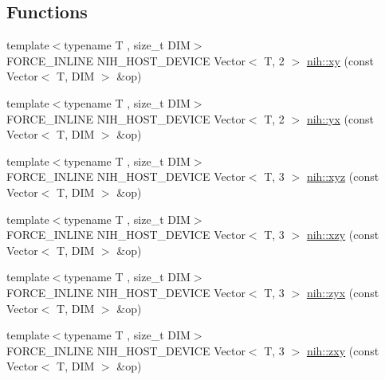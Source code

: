 \subsection*{\-Functions}
\begin{DoxyCompactItemize}
\item 
{\footnotesize template$<$typename T , size\-\_\-t \-D\-I\-M$>$ }\\\-F\-O\-R\-C\-E\-\_\-\-I\-N\-L\-I\-N\-E \-N\-I\-H\-\_\-\-H\-O\-S\-T\-\_\-\-D\-E\-V\-I\-C\-E \*
\-Vector$<$ \-T, 2 $>$ \hyperlink{group__vectors_gab815e30e4a8c47b3ff177de0ba4162cb}{nih\-::xy} (const \-Vector$<$ \-T, \-D\-I\-M $>$ \&op)
\item 
{\footnotesize template$<$typename T , size\-\_\-t \-D\-I\-M$>$ }\\\-F\-O\-R\-C\-E\-\_\-\-I\-N\-L\-I\-N\-E \-N\-I\-H\-\_\-\-H\-O\-S\-T\-\_\-\-D\-E\-V\-I\-C\-E \*
\-Vector$<$ \-T, 2 $>$ \hyperlink{group__vectors_gaa33a532874bb7f0c3977391f83dc64a3}{nih\-::yx} (const \-Vector$<$ \-T, \-D\-I\-M $>$ \&op)
\item 
{\footnotesize template$<$typename T , size\-\_\-t \-D\-I\-M$>$ }\\\-F\-O\-R\-C\-E\-\_\-\-I\-N\-L\-I\-N\-E \-N\-I\-H\-\_\-\-H\-O\-S\-T\-\_\-\-D\-E\-V\-I\-C\-E \*
\-Vector$<$ \-T, 3 $>$ \hyperlink{group__vectors_ga283f58e199d448be6746baec9dec6ac1}{nih\-::xyz} (const \-Vector$<$ \-T, \-D\-I\-M $>$ \&op)
\item 
{\footnotesize template$<$typename T , size\-\_\-t \-D\-I\-M$>$ }\\\-F\-O\-R\-C\-E\-\_\-\-I\-N\-L\-I\-N\-E \-N\-I\-H\-\_\-\-H\-O\-S\-T\-\_\-\-D\-E\-V\-I\-C\-E \*
\-Vector$<$ \-T, 3 $>$ \hyperlink{group__vectors_ga789568ee5abe245a1789c972459d9208}{nih\-::xzy} (const \-Vector$<$ \-T, \-D\-I\-M $>$ \&op)
\item 
{\footnotesize template$<$typename T , size\-\_\-t \-D\-I\-M$>$ }\\\-F\-O\-R\-C\-E\-\_\-\-I\-N\-L\-I\-N\-E \-N\-I\-H\-\_\-\-H\-O\-S\-T\-\_\-\-D\-E\-V\-I\-C\-E \*
\-Vector$<$ \-T, 3 $>$ \hyperlink{group__vectors_ga8ba75af33f38985f639aa3f3abe0dce2}{nih\-::zyx} (const \-Vector$<$ \-T, \-D\-I\-M $>$ \&op)
\item 
{\footnotesize template$<$typename T , size\-\_\-t \-D\-I\-M$>$ }\\\-F\-O\-R\-C\-E\-\_\-\-I\-N\-L\-I\-N\-E \-N\-I\-H\-\_\-\-H\-O\-S\-T\-\_\-\-D\-E\-V\-I\-C\-E \*
\-Vector$<$ \-T, 3 $>$ \hyperlink{group__vectors_ga531fcf7af9a93262536231c3fb69cb4f}{nih\-::zxy} (const \-Vector$<$ \-T, \-D\-I\-M $>$ \&op)
\item 

\end{DoxyCompactItemize}
